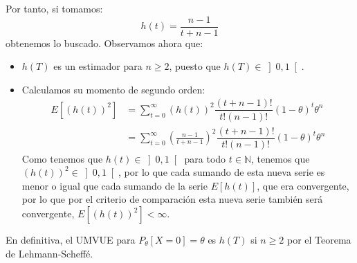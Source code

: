 \begin{ejercicio}
\begin{enumerate}
\begin{equation*}
            \end{equation*}
            Por tanto, si tomamos:
            \begin{equation*}
                h(t) = \dfrac{n-1}{t+n-1}
            \end{equation*}
            obtenemos lo buscado. Observamos ahora que:
            \begin{itemize}
                \item $h(T)$ es un estimador para $n\geq 2$, puesto que $h(T)\in \left]0,1\right[$.
                \item Calculamos su momento de segundo orden:
                    \begin{align*}
                        E[{(h(t))}^{2}] &=\sum_{t=0}^{\infty}{(h(t))}^{2}\dfrac{(t+n-1)!}{t!(n-1)!}{(1-\theta)}^{t}\theta^n \\
                                        &=\sum_{t=0}^{\infty}{\left(\frac{n-1}{t+n-1}\right)}^{2}\dfrac{(t+n-1)!}{t!(n-1)!}{(1-\theta)}^{t}\theta^n
                    \end{align*}
                    Como tenemos que $h(t)\in \left]0,1\right[$ para todo $t\in \mathbb{N}$, tenemos que ${(h(t))}^{2}\in \left]0,1\right[$, por lo que cada sumando de esta nueva serie es menor o igual que cada sumando de la serie $E[h(t)]$, que era convergente, por lo que por el criterio de comparación esta nueva serie también será convergente, $E[{(h(t))}^{2}]<\infty$.
            \end{itemize}
            En definitiva, el UMVUE para $P_\theta[X=0]=\theta$ es $h(T)$ si $n\geq 2$ por el Teorema de Lehmann-Scheffé.
    \end{enumerate}
\end{ejercicio}

